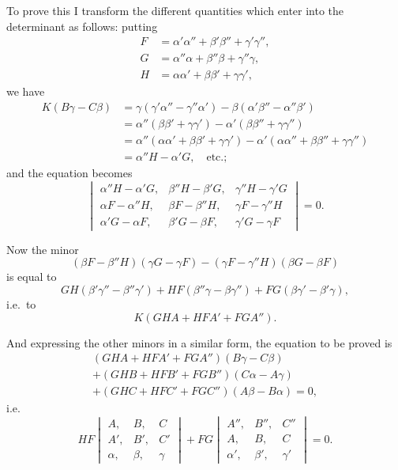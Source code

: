 \documentclass[12pt,a4paper]{article}
\theoremstyle{plain}
\begin{document}
To prove this I transform the different quantities which enter into the determinant as follows: putting
\begin{align*}
F &= \alpha'\alpha'' + \beta'\beta'' + \gamma'\gamma'', \\
G &= \alpha''\alpha + \beta''\beta + \gamma''\gamma, \\
H &= \alpha\alpha' + \beta\beta' + \gamma\gamma',
\end{align*}
we have
\begin{align*}
K(B\gamma - C\beta) &= \gamma(\gamma'\alpha'' - \gamma''\alpha') - \beta(\alpha'\beta'' - \alpha''\beta') \\
&= \alpha''(\beta\beta' + \gamma\gamma') - \alpha'(\beta\beta'' + \gamma\gamma'') \\
&= \alpha''(\alpha\alpha' + \beta\beta' + \gamma\gamma') - \alpha'(\alpha\alpha'' + \beta\beta'' + \gamma\gamma'') \\
&= \alpha'' H - \alpha' G, \quad \text{etc.};
\end{align*}
and the equation becomes
\[
\begin{vmatrix}
\alpha'' H - \alpha' G, & \beta'' H - \beta' G, & \gamma'' H - \gamma' G \\
\alpha F - \alpha'' H, & \beta F - \beta'' H, & \gamma F - \gamma'' H \\
\alpha' G - \alpha F, & \beta' G - \beta F, & \gamma' G - \gamma F
\end{vmatrix}
= 0.
\]

Now the minor
\[
(\beta F - \beta'' H)(\gamma G - \gamma F) - (\gamma F - \gamma'' H)(\beta G - \beta F)
\]
is equal to
\[
GH(\beta'\gamma'' - \beta''\gamma') + HF(\beta''\gamma - \beta\gamma'') + FG(\beta\gamma' - \beta'\gamma),
\]
i.e.\ to
\[
K(GHA + HFA' + FGA'').
\]

And expressing the other minors in a similar form, the equation to be proved is
\begin{multline*}
(GHA + HFA' + FGA'') (B\gamma - C\beta) \\
+ (GHB + HFB' + FGB'') (C\alpha - A\gamma) \\
+ (GHC + HFC' + FGC'') (A\beta - B\alpha) = 0,
\end{multline*}
i.e.
\[
HF
\begin{vmatrix}
A, & B, & C \\
A', & B', & C' \\
\alpha, & \beta, & \gamma
\end{vmatrix}
+
FG
\begin{vmatrix}
A'', & B'', & C'' \\
A, & B, & C \\
\alpha', & \beta', & \gamma'
\end{vmatrix}
= 0.
\]
\end{document}
